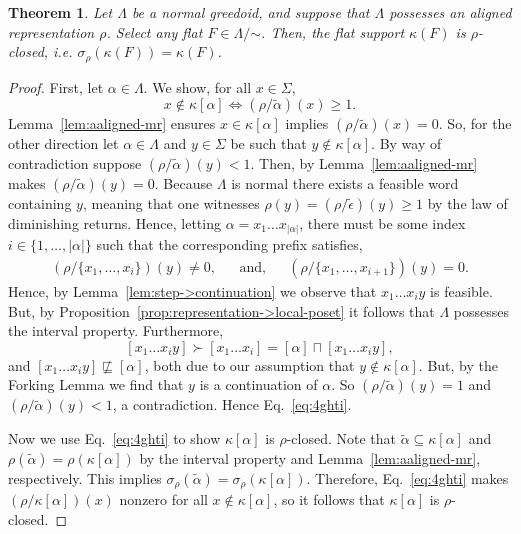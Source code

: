 \documentclass[11pt]{article}
\newtheorem{theorem}{Theorem}[section]
\newcommand{\univ}{\Sigma}
\newcommand{\glang}{\Lambda}
\begin{document}
\begin{theorem}\label{thm:flat supports-are-closed}
    Let $\glang$ be a normal greedoid, and suppose that $\glang$ possesses an aligned representation $\rho$.
    Select any flat $F\in\glang/\mathord{\sim}$.
    Then, the flat support $\kappa(F)$ is $\rho$-closed, i.e. $\sigma_\rho(\kappa(F)) = \kappa(F)$.
\end{theorem}
\begin{proof}
    First, let $\alpha\in\glang$.
    We show, for all $x \in \univ$,
    \begin{equation}\label{eq:4ghti}
        x\notin\kappa[\alpha] \iff (\rho/\widetilde{\alpha})(x) \geq 1.
    \end{equation}
    Lemma~\ref{lem:aaligned-mr} ensures $x \in \kappa[\alpha]$ implies $(\rho/\widetilde{\alpha})(x) = 0$.
    So, for the other direction let $\alpha \in \glang$ and $y \in \univ$ be such that $y \notin \kappa[\alpha]$.
    By way of contradiction suppose $(\rho/\widetilde{\alpha})(y) < 1$.
    Then, by Lemma~\ref{lem:aaligned-mr} makes $(\rho/\widetilde{\alpha})(y) = 0$.
    Because $\glang$ is normal there exists a feasible word containing $y$, meaning that one witnesses $\rho(y) = (\rho/\widetilde{\epsilon})(y) \geq 1$ by the law of diminishing returns.
    Hence, letting $\alpha = x_1\ldots x_{|\alpha|}$, there must be some index $i \in \{1,\ldots, |\alpha|\}$ such that the corresponding prefix satisfies,
    \begin{align*}
        (\rho/\{x_1,\ldots,x_i\})(y) \neq 0,&&\text{and,}&&(\rho/\{x_1,\ldots,x_{i+1}\})(y) = 0.
    \end{align*}
    Hence, by Lemma~\ref{lem:step->continuation} we observe that $x_1\ldots x_i y$ is feasible.
    But, by Proposition~\ref{prop:representation->local-poset} it follows that $\glang$ possesses the interval property.
    Furthermore,
    \[
        [x_1\ldots x_i y] \succ [x_1\ldots x_i] = [\alpha] \sqcap [x_1 \ldots x_i y],
    \]
    and $[x_1\ldots x_i y] \not \sqsubseteq [\alpha]$, both due to our assumption that $y \notin \kappa[\alpha]$.
    But, by the Forking Lemma we find that $y$ is a continuation of $\alpha$.
    So $(\rho/\widetilde{\alpha})(y) = 1$ and $(\rho/\widetilde{\alpha})(y) < 1$, a contradiction.
    Hence Eq.~\ref{eq:4ghti}.

    Now we use Eq.~\ref{eq:4ghti} to show $\kappa[\alpha]$ is $\rho$-closed.
    Note that $\widetilde{\alpha}\subseteq\kappa[\alpha]$ and $\rho(\widetilde{\alpha}) = \rho(\kappa[\alpha])$ by the interval property and Lemma~\ref{lem:aaligned-mr}, respectively.
    This implies $\sigma_\rho(\widetilde{\alpha}) = \sigma_\rho(\kappa[\alpha])$.
    Therefore, Eq.~\ref{eq:4ghti} makes $(\rho/\kappa[\alpha])(x)$ nonzero for all $x\notin\kappa[\alpha]$, so it follows that $\kappa[\alpha]$ is $\rho$-closed.
\end{proof}
\end{document}
